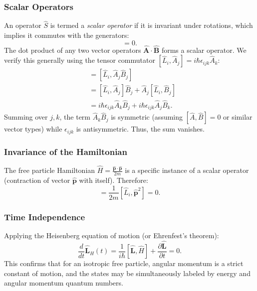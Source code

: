 \subsubsection{Scalar Operators}
An operator $\hat{S}$ is termed a \textit{scalar operator} if it is invariant
under rotations, which implies it commutes with the generators:
\begin{equation}
  [\hat{L}_i, \hat{S}] = 0.
\end{equation}
The dot product of any two vector operators $\hat{\mathbf{A}} \cdot
\hat{\mathbf{B}}$ forms a scalar operator. We verify this generally using the
tensor commutator $[\hat{L}_i, \hat{A}_j] = i\hbar \epsilon_{ijk}\hat{A}_k$:
\begin{align}
  [\hat{L}_i, \hat{\mathbf{A}}\cdot\hat{\mathbf{B}}] &= [\hat{L}_i, \hat{A}_j
  \hat{B}_j] \nonumber \\
                                                     &= [\hat{L}_i, \hat{A}_j]\hat{B}_j + \hat{A}_j[\hat{L}_i, \hat{B}_j]
                                                     \nonumber \\
                                                     &= i\hbar \epsilon_{ijk} \hat{A}_k \hat{B}_j + i\hbar \epsilon_{ijk}
                                                     \hat{A}_j \hat{B}_k.
\end{align}
Summing over $j,k$, the term $\hat{A}_k \hat{B}_j$ is symmetric (assuming
$[\hat{A},\hat{B}]=0$ or similar vector types) while $\epsilon_{ijk}$ is
antisymmetric. Thus, the sum vanishes.

\subsubsection{Invariance of the Hamiltonian}
The free particle Hamiltonian $\hat{H} = \frac{\hat{\mathbf{p}} \cdot
\hat{\mathbf{p}}}{2m}$ is a specific instance of a scalar operator (contraction
of vector $\hat{\mathbf{p}}$ with itself). Therefore:
\begin{equation}
  [\hat{L}_i, \hat{H}] = \frac{1}{2m} [\hat{L}_i, \hat{\mathbf{p}}^2] = 0.
\end{equation}

\subsubsection{Time Independence}
Applying the Heisenberg equation of motion (or Ehrenfest's theorem):
\begin{equation}
  \frac{d}{dt} \hat{\mathbf{L}}_H(t) = \frac{1}{i\hbar} [\hat{\mathbf{L}},
  \hat{H}] + \frac{\partial \hat{\mathbf{L}}}{\partial t} = 0.
\end{equation}
This confirms that for an isotropic free particle, angular momentum is a strict
constant of motion, and the states may be simultaneously labeled by energy and
angular momentum quantum numbers.

